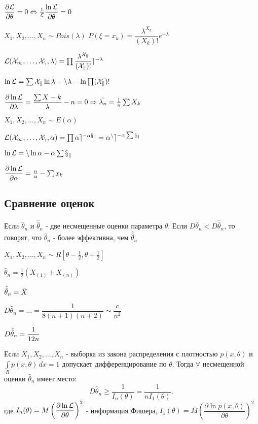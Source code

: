 $\dfrac{\partial \cal L}{\partial \theta} = 0 \Leftrightarrow \frac{1}{\cal L} \dfrac{\ln \cal L}{\partial \theta} = 0$

\begin{ex}
  $X_1, X_2, \dots, X_n \sim Pois(\lambda)$
  $P(\xi=x_k) = \dfrac{\lambda^{X_k}}{(X_k)!} e^{-\lambda}$

  $\cal L(X_1, \dots, X_n, \lambda) = \prod \dfrac{\lambda^{X_k}}{(X_k)!} e^{-\lambda}$

  $\ln \cal{L} = \sum X_k \ln\lambda - n \lambda - \ln \prod (X_k)!$

  $\dfrac{\partial \ln \cal{L}}{\partial \lambda} = \dfrac{\sum X-k}{\lambda} - n = 0 \Rightarrow \bar{\lambda_n} = \frac{1}{n} \sum X_k$
\end{ex}

\begin{ex}
  $X_1, X_2, \dots, X_n \sim E(\alpha)$

  $\cal{L}(X_1, \dots, X_n, \alpha) = \prod \alpha e^{-\alpha x_k} = \alpha^n e^{-\alpha \sum x_k}$

  $\ln \cal{L} = n \ln\alpha - \alpha \sum x_k$

  $\dfrac{\partial \ln\cal{L}}{\partial \alpha} = \frac{n}{\alpha} - \sum x_k$
\end{ex}

\subsection{Сравнение оценок}

\begin{definition}
  Если $\hat \theta_n$ и $\widehat{\widehat{\theta}}_n$ - две несмещенные оценки параметра $\theta$.
  Если $D \hat\theta_n < D \hat\hat\theta_n$, то говорят, что $\hat\theta_n$ - более эффективна, чем $\hat\hat\theta_n$
\end{definition}

\begin{ex}
  $X_1, X_2, \dots, X_n \sim R[\theta-\frac{1}{2}, \theta+\frac{1}{2}]$

  $\hat\theta_n = \frac{1}{2} (X_{(1)} + X_{(n)})$
  
  $\Hat{\Hat{\theta}}_n = \bar X$

  $D\hat\theta_n = \dots = \dfrac{1}{8 (n+1) (n+2)} \sim \dfrac{c}{n^2}$

  $D\Hat{\Hat{\theta}}_n = \dfrac{1}{12n}$
\end{ex}

\begin{theorem}
  Если $X_1, X_2, \dots, X_n$ - выборка из закона распределения с плотностью $p(x, \theta)$ и $\int\limits_R p(x, \theta) \, dx = 1$ допускает дифференцирование по $\theta$.
  Тогда $\forall$ несмещенной оценки $\hat\theta_n$ имеет место:
  $$D\hat\theta_n \geqslant \frac{1}{I_n(\theta)} = \frac{1}{n I_1(\theta)},$$
  где $I_n(\theta) = M\left( \dfrac{\partial \ln \cal{L}}{\partial \theta} \right)^2$ - информация Фишера,
    $I_1(\theta) = M\left( \dfrac{\partial\ln p(x, \theta)}{\partial\theta} \right)^2$
\end{theorem}

